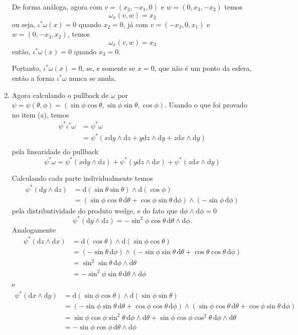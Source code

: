 \documentclass[a4paper, 11pt]{article}
\newcommand{\rd}{\mathrm d}
\begin{document}
\begin{enumerate}[leftmargin=*, label=\alph*.]
    De forma análoga, agora com $v = (x_2, -x_1, 0)$ e $w = (0, x_3, -x_2)$ temos 
    \[
        \omega_x (v, w) = x_2
    \]
    ou seja, $\iota^* \omega (x) = 0$ quando $x_2 = 0$, já com $v = (-x_3, 0, x_1)$ e $w = (0, -x_3, x_2)$, temos
    \[
        \omega_x (v, w) = x_3
    \]
    então, $\iota^* \omega (x) = 0$ quando $x_3 = 0$.

    Portanto, $\iota^* \omega (x) = 0$, se, e somente se $x = 0$, que não é um ponto da esfera, então a forma $\iota^* \omega$ nunca se anula.
    
    \item Agora calculando o pullback de $\omega$ por $\psi = \psi(\theta, \phi) = (\sin \phi \cos \theta, \sin \phi \sin \theta, \cos \phi)$. Usando o que foi provado no item (a), temos
    \begin{align*}
        \psi^* \iota^* \omega &= \psi^* \omega\\
        &= \psi^* (x \rd y \wedge  \rd z + y \rd z \wedge \rd y + z \rd x \wedge \rd y)\\
    \end{align*}
    pela linearidade do pullback
    \[
        \psi^* \omega = \psi^* (x \rd y \wedge \rd z) + \psi^* (y \rd z \wedge \rd x) + \psi^* (z \rd x \wedge \rd y) 
    \]
    
    Calculando cada parte individualmente temos
    \begin{align*}
        \psi^* (\rd y \wedge \rd z) &= \rd (\sin\theta \sin \theta) \wedge \rd (\cos \phi)\\
        &= (\sin \phi \cos \theta \, \rd \theta + \cos \phi \sin \theta \, \rd \phi) \wedge (-\sin \phi \, \rd \phi)
    \end{align*}
    pela distributividade do produto wedge, e do fato que $\rd \phi \wedge \rd \phi = 0$
    \[
        \psi^* (\rd y \wedge \rd z) = -\sin^2 \phi \cos \theta \, \rd \theta \wedge \rd \phi.
    \]
    Analogamente
    \begin{align*}
        \psi^* (\rd z \wedge \rd x) &= \rd (\cos \theta) \wedge \rd (\sin \phi \cos \theta)\\
        &= (-\sin \theta \, \rd \phi) \wedge (-\sin \phi \sin \theta \, \rd \theta + \cos \theta \cos \theta \, \rd \phi)\\
        &= \sin^2 \sin \theta \, \rd \phi \wedge \rd \theta\\
        &= -\sin^2 \phi \sin \theta \, \rd \theta \wedge \rd \phi
    \end{align*}
    e
    \begin{align*}
        \psi^* (\rd x \wedge \rd y) &= \rd(\sin \phi \cos \theta) \wedge \rd (\sin \phi \sin \theta)\\
        &= (-\sin \phi \sin \theta \, \rd \theta + \cos \phi \cos \theta \, \rd \phi) \wedge (\sin \phi \cos \theta \, \rd \theta + \cos \phi \sin \theta \, \rd \phi)\\
        &= \sin \phi \cos \phi \sin^2 \theta \, \rd \phi \wedge \rd \theta + \sin \phi \cos \phi \cos^2 \theta \, \rd \phi \wedge \rd \theta\\
        &= -\sin \phi \cos \phi \, \rd \theta \wedge \rd \phi
    \end{align*}
    

\end{enumerate}
\end{document}
